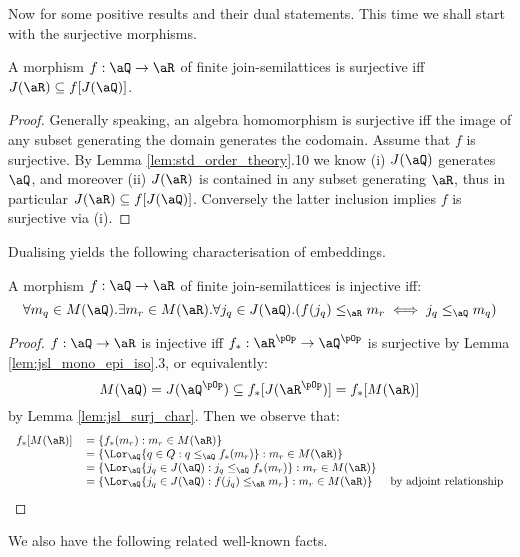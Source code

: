 \documentclass{article}
\begin{document}
Now for some positive results and their dual statements. This time we shall start with the surjective morphisms.

\begin{lemma}
\label{lem:jsl_surj_char}
A morphism $f : \aQ \to \aR$ of finite join-semilattices is surjective iff $J(\aR) \subseteq f[J(\aQ)]$.
\end{lemma}

\begin{proof}
Generally speaking, an algebra homomorphism is surjective iff the image of any subset generating the domain generates the codomain. Assume that $f$ is surjective. By Lemma \ref{lem:std_order_theory}.10 we know (i) $J(\aQ)$ generates $\aQ$, and moreover (ii) $J(\aR)$ is contained in any subset generating $\aR$, thus in particular $J(\aR) \subseteq f[J(\aQ)]$. Conversely the latter inclusion implies $f$ is surjective via (i).
\end{proof}

Dualising yields the following characterisation of embeddings.

%
%

\begin{lemma}
\label{lem:jsl_embed_irr_char}
A morphism $f : \aQ \to \aR$ of finite join-semilattices is injective iff:
\[
\forall m_q \in M(\aQ). \exists m_r \in M(\aR). \forall j_q \in J(\aQ).
(f(j_q) \leq_\aR m_r \iff j_q \leq_\aQ m_q)
\]
\end{lemma}

\begin{proof}
$f : \aQ \to \aR$ is injective iff $f_* : \aR^{\pOp} \to \aQ^{\pOp}$ is surjective by Lemma \ref{lem:jsl_mono_epi_iso}.3, or equivalently:
\[
M(\aQ) = J(\aQ^{\pOp}) \subseteq f_*[J(\aR^{\pOp})] = f_*[M(\aR)]
\]
by Lemma \ref{lem:jsl_surj_char}. Then we observe that:
\[
\begin{tabular}{lll}
$f_*[M(\aR)]$
&
$= \{ f_*(m_r) : m_r \in M(\aR) \}$
\\&
$= \{ \Lor_\aQ \{q \in Q : q \leq_\aQ f_*(m_r) \} : m_r \in M(\aR) \}$
\\&
$= \{ \Lor_\aQ \{j_q \in J(\aQ) : j_q \leq_\aQ f_*(m_r) \} : m_r \in M(\aR) \}$
\\&
$= \{ \Lor_\aQ \{j_q \in J(\aQ) : f(j_q) \leq_\aR m_r \} : m_r \in M(\aR) \}$
& by adjoint relationship
\end{tabular}
\]
\end{proof}


We also have the following related well-known facts.
\end{document}
